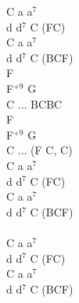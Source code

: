 \documentclass[a5paper, 10pt]{book}
\begin{document}
\begin{minipage}[t]{0.3\textwidth}
  C a a$^7$\\
  d d$^7$ C (FC)\\
  C a a$^7$\\
  d d$^7$ C (BCF)\\

  F\\
  F$^{+9}$ G\\
  C ... BCBC\\
  F\\
  F$^{+9}$ G\\
  C ... (F C, C)\\

  C a a$^7$\\
  d d$^7$ C (FC)\\
  C a a$^7$\\
  d d$^7$ C (BCF)\\

  ~\\

  C a a$^7$\\
  d d$^7$ C (FC)\\
  C a a$^7$\\
  d d$^7$ C (BCF)\\

  ~\\
\end{minipage}

\newpage
\end{document}
